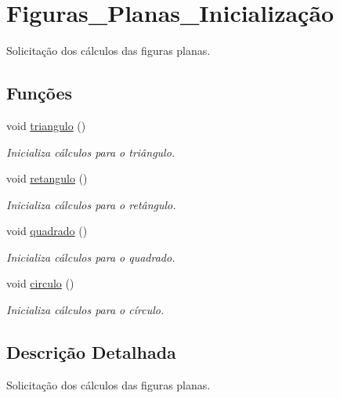 \hypertarget{group__Figuras__Planas__Inicializa_xC3_xA7_xC3_xA3o}{}\section{Figuras\+\_\+\+Planas\+\_\+\+Inicialização}
\label{group__Figuras__Planas__Inicializa_xC3_xA7_xC3_xA3o}


Solicitação dos cálculos das figuras planas.  


\subsection*{Funções}
\begin{DoxyCompactItemize}
\item 
void \hyperlink{group__Figuras__Planas__Inicializa_xC3_xA7_xC3_xA3o_ga8928cef04d4cd48e92adf3569f6d185b}{triangulo} ()\hypertarget{group__Figuras__Planas__Inicializa_xC3_xA7_xC3_xA3o_ga8928cef04d4cd48e92adf3569f6d185b}{}\label{group__Figuras__Planas__Inicializa_xC3_xA7_xC3_xA3o_ga8928cef04d4cd48e92adf3569f6d185b}

\begin{DoxyCompactList}\small\item\em Inicializa cálculos para o triângulo. \end{DoxyCompactList}\item 
void \hyperlink{group__Figuras__Planas__Inicializa_xC3_xA7_xC3_xA3o_gafa7da114af5845aed90385aaad07745f}{retangulo} ()\hypertarget{group__Figuras__Planas__Inicializa_xC3_xA7_xC3_xA3o_gafa7da114af5845aed90385aaad07745f}{}\label{group__Figuras__Planas__Inicializa_xC3_xA7_xC3_xA3o_gafa7da114af5845aed90385aaad07745f}

\begin{DoxyCompactList}\small\item\em Inicializa cálculos para o retângulo. \end{DoxyCompactList}\item 
void \hyperlink{group__Figuras__Planas__Inicializa_xC3_xA7_xC3_xA3o_ga59a769deb5a89245b0b2a7760179708e}{quadrado} ()\hypertarget{group__Figuras__Planas__Inicializa_xC3_xA7_xC3_xA3o_ga59a769deb5a89245b0b2a7760179708e}{}\label{group__Figuras__Planas__Inicializa_xC3_xA7_xC3_xA3o_ga59a769deb5a89245b0b2a7760179708e}

\begin{DoxyCompactList}\small\item\em Inicializa cálculos para o quadrado. \end{DoxyCompactList}\item 
void \hyperlink{group__Figuras__Planas__Inicializa_xC3_xA7_xC3_xA3o_ga28482bc381ce414df86e4fdb9e3e6da5}{circulo} ()\hypertarget{group__Figuras__Planas__Inicializa_xC3_xA7_xC3_xA3o_ga28482bc381ce414df86e4fdb9e3e6da5}{}\label{group__Figuras__Planas__Inicializa_xC3_xA7_xC3_xA3o_ga28482bc381ce414df86e4fdb9e3e6da5}

\begin{DoxyCompactList}\small\item\em Inicializa cálculos para o círculo. \end{DoxyCompactList}\end{DoxyCompactItemize}


\subsection{Descrição Detalhada}
Solicitação dos cálculos das figuras planas. 

